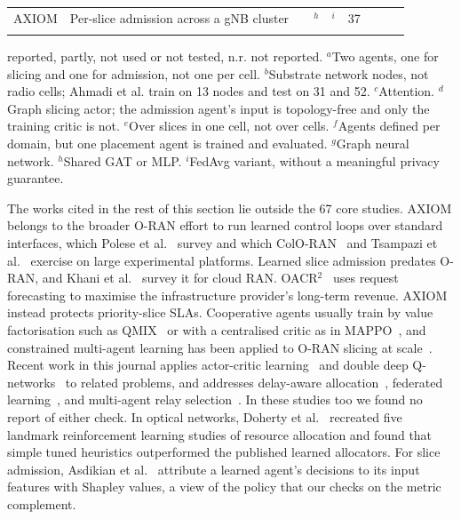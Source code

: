 \documentclass[pdflatex,sn-basic,Numbered]{sn-jnl}
\newcommand{\gyes}{\checkmark}
\newcommand{\gno}{\ding{55}}
\newcommand{\gpart}{\LEFTcircle}
\newcommand{\gnr}{n.r.}
\begin{document}
\begin{table}[!htbp]
{\begin{tabular}{@{}>{\raggedright\arraybackslash}p{2.45cm}>{\raggedright\arraybackslash}p{3.6cm}ccccccc@{}}
\midrule
AXIOM & Per-slice admission across a gNB cluster & \gyes & \gyes$^{h}$ & \gyes$^{i}$ & 37 & \gyes & \gyes & \gyes \\
\botrule
\end{tabular}}
\par\smallskip
{\raggedright\scriptsize \gyes{} reported, \gpart{} partly, \gno{} not used or not tested, \gnr{} not reported. $^{a}$Two agents, one for slicing and one for admission, not one per cell. $^{b}$Substrate network nodes, not radio cells; Ahmadi et al. train on 13 nodes and test on 31 and 52. $^{c}$Attention. $^{d}$Graph slicing actor; the admission agent's input is topology-free and only the training critic is not. $^{e}$Over slices in one cell, not over cells. $^{f}$Agents defined per domain, but one placement agent is trained and evaluated. $^{g}$Graph neural network. $^{h}$Shared GAT or MLP. $^{i}$FedAvg variant, without a meaningful privacy guarantee.\par}
\end{table}

The works cited in the rest of this section lie outside the 67 core studies. AXIOM belongs to the broader O-RAN effort to run learned control loops over standard interfaces, which Polese et al.~\cite{polese2023oran} survey and which ColO-RAN~\cite{polese2023coloran} and Tsampazi et al.~\cite{tsampazi2023xapps} exercise on large experimental platforms. Learned slice admission predates O-RAN, and Khani et al.~\cite{khani2024sacsurvey} survey it for cloud RAN. OACR$^{2}$~\cite{li2025oacr2} uses request forecasting to maximise the infrastructure provider's long-term revenue. AXIOM instead protects priority-slice SLAs. Cooperative agents usually train by value factorisation such as QMIX~\cite{gronauer2022marl} or with a centralised critic as in MAPPO~\cite{yu2022mappo}, and constrained multi-agent learning has been applied to O-RAN slicing at scale~\cite{zangooei2024flexible}. Recent work in this journal applies actor-critic learning~\cite{kulkarni2024actor} and double deep Q-networks~\cite{kamal2026ddqn} to related problems, and addresses delay-aware allocation~\cite{alqahtani2025dynamic}, federated learning~\cite{krishnamoorthy2026federated}, and multi-agent relay selection~\cite{sirma2025relay}. In these studies too we found no report of either check. In optical networks, Doherty et al.~\cite{doherty2025hype} recreated five landmark reinforcement learning studies of resource allocation and found that simple tuned heuristics outperformed the published learned allocators. For slice admission, Asdikian et al.~\cite{asdikian2025verifying} attribute a learned agent's decisions to its input features with Shapley values, a view of the policy that our checks on the metric complement.
\end{document}
